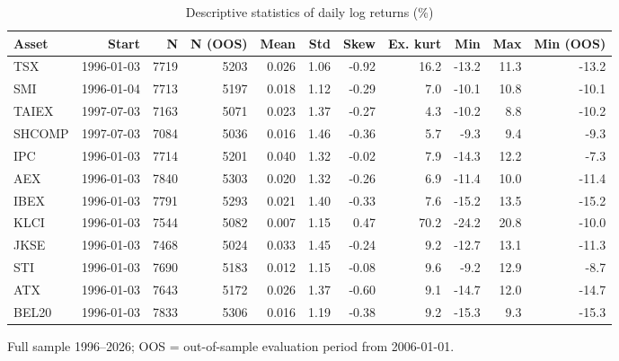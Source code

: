 \begin{table}[htbp]
\centering
\footnotesize
\caption{Descriptive statistics of daily log returns (\%)}
\label{tab:desc}
\begin{tabular}{lrrrrrrrrrr}
\toprule
Asset & Start & N & N (OOS) & Mean & Std & Skew & Ex. kurt & Min & Max & Min (OOS) \\
\midrule
TSX & 1996-01-03 & 7719 & 5203 & 0.026 & 1.06 & -0.92 & 16.2 & -13.2 & 11.3 & -13.2 \\
SMI & 1996-01-04 & 7713 & 5197 & 0.018 & 1.12 & -0.29 & 7.0 & -10.1 & 10.8 & -10.1 \\
TAIEX & 1997-07-03 & 7163 & 5071 & 0.023 & 1.37 & -0.27 & 4.3 & -10.2 & 8.8 & -10.2 \\
SHCOMP & 1997-07-03 & 7084 & 5036 & 0.016 & 1.46 & -0.36 & 5.7 & -9.3 & 9.4 & -9.3 \\
IPC & 1996-01-03 & 7714 & 5201 & 0.040 & 1.32 & -0.02 & 7.9 & -14.3 & 12.2 & -7.3 \\
AEX & 1996-01-03 & 7840 & 5303 & 0.020 & 1.32 & -0.26 & 6.9 & -11.4 & 10.0 & -11.4 \\
IBEX & 1996-01-03 & 7791 & 5293 & 0.021 & 1.40 & -0.33 & 7.6 & -15.2 & 13.5 & -15.2 \\
KLCI & 1996-01-03 & 7544 & 5082 & 0.007 & 1.15 & 0.47 & 70.2 & -24.2 & 20.8 & -10.0 \\
JKSE & 1996-01-03 & 7468 & 5024 & 0.033 & 1.45 & -0.24 & 9.2 & -12.7 & 13.1 & -11.3 \\
STI & 1996-01-03 & 7690 & 5183 & 0.012 & 1.15 & -0.08 & 9.6 & -9.2 & 12.9 & -8.7 \\
ATX & 1996-01-03 & 7643 & 5172 & 0.026 & 1.37 & -0.60 & 9.1 & -14.7 & 12.0 & -14.7 \\
BEL20 & 1996-01-03 & 7833 & 5306 & 0.016 & 1.19 & -0.38 & 9.2 & -15.3 & 9.3 & -15.3 \\
\bottomrule
\end{tabular}
\par\smallskip\parbox{\linewidth}{\scriptsize Full sample 1996--2026; OOS = out-of-sample evaluation period from 2006-01-01.}
\end{table}